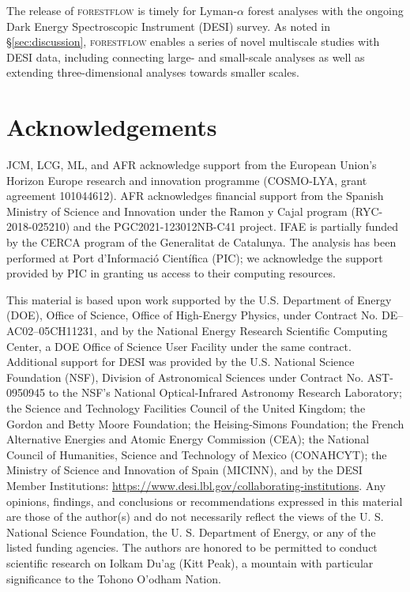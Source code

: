 \documentclass[fleqn,usenatbib]{mnras}
\newcommand{\lyaf}{Lyman-$\alpha$ forest\xspace}
\newcommand{\forestflow}{\textsc{forestflow}\xspace}
\begin{document}
The release of \forestflow is timely for \lyaf analyses with the ongoing Dark Energy Spectroscopic Instrument (DESI) survey. As noted in \S\ref{sec:discussion}, \forestflow enables a series of novel multiscale studies with DESI data, including connecting large- and small-scale analyses as well as extending three-dimensional analyses towards smaller scales.



\section*{Acknowledgements}

JCM, LCG, ML, and AFR acknowledge support from the European Union’s Horizon Europe research and innovation programme (COSMO-LYA, grant agreement 101044612). AFR acknowledges financial support from the Spanish Ministry of Science and Innovation under the Ramon y Cajal program (RYC-2018-025210) and the PGC2021-123012NB-C41 project. IFAE is partially funded by the CERCA program of the Generalitat de Catalunya. The analysis has been performed at Port d’Informaci\'o Cient\'ifica (PIC); we acknowledge the support provided by PIC in granting us access to their computing resources.

This material is based upon work supported by the U.S. Department of Energy (DOE), Office of Science, Office of High-Energy Physics, under Contract No. DE–AC02–05CH11231, and by the National Energy Research Scientific Computing Center, a DOE Office of Science User Facility under the same contract. Additional support for DESI was provided by the U.S. National Science Foundation (NSF), Division of Astronomical Sciences under Contract No. AST-0950945 to the NSF’s National Optical-Infrared Astronomy Research Laboratory; the Science and Technology Facilities Council of the United Kingdom; the Gordon and Betty Moore Foundation; the Heising-Simons Foundation; the French Alternative Energies and Atomic Energy Commission (CEA); the National Council of Humanities, Science and Technology of Mexico (CONAHCYT); the Ministry of Science and Innovation of Spain (MICINN), and by the DESI Member Institutions: \url{https://www.desi.lbl.gov/collaborating-institutions}. Any opinions, findings, and conclusions or recommendations expressed in this material are those of the author(s) and do not necessarily reflect the views of the U. S. National Science Foundation, the U. S. Department of Energy, or any of the listed funding agencies. The authors are honored to be permitted to conduct scientific research on Iolkam Du’ag (Kitt Peak), a mountain with particular significance to the Tohono O’odham Nation.
\end{document}
